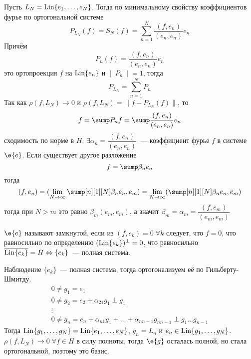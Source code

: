 \documentclass[14pt]{extarticle}
\newcommand{\Line}[2]{\Lin\{#1_1,\dots, #1_#2\}}
\begin{document}
\begin{Proof}
    Пусть $L_N = \Line{e}{N}$.
    Тогда по минимальному свойству коэффициентов фурье по ортогональной системе
    $$
    P_{L_N}(f) = S_N(f) = \sum\limits_{n = 1}^N\dfrac{(f, e_n)}{(e_n, e_n)}e_n
    $$
    Причём
    $$
    P_n(f) = \dfrac{(f, e_n)}{(e_n, e_n)}e_n
    $$
    это ортопроекция $f$  на $\operatorname{Lin}\{e_n\}$ и $\|P_n\| = 1$, тогда
    $$
    P_{L_N} = \sum\limits_{n = 1}^N P_n
    $$
    Так как $\rho(f, L_N) \to 0$ и $\rho(f, L_N) = \|f - P_{L_N}(f)\|$, то
    $$
    f = \sump P_nf = \sump \dfrac{(f, e_n)}{(e_n, e_n)}e_n
    $$
    сходимость по норме в $H$.
    $\exists \alpha_n = \dfrac{(f, e_n)}{(e_n, e_n)}$~--- коэффициент фурье $f$ в системе
    $\e{e}$.
    Если существует другое разложение
    $$
    f = \sump \beta_n e_n
    $$
    тогда
    $$
    (f, e_n) = (\lim_{N \to \infty} \sump[n][1][N] \beta_n e_n, e_m) = \lim_{N \to \infty}
    ( \sump[n][1][N] \beta_n e_n, e_m)
    $$
    тогда при $N > m$ это равно $\beta_m (e_m, e_m)$, а значит $\beta_m = \alpha_m =
    \dfrac{(f, e_m)}{(e_m, e_m)}$
\end{Proof}
\begin{Opr}
    $\e{e}$ называют замкнутой, если из $(f, e_k) = 0\; \forall k$ следует, что $f = 0$, что
    равносильно по определению $(\operatorname{Lin}\{e_k\})^\perp = 0$, что равносильно 
    $\overline{\operatorname{Lin}\{e_k\}} = H \Leftrightarrow \{e_k\}$~--- полная система.
\end{Opr}
\begin{MathCl}{Наблюдение}
    $\{e_k\}$~--- полная система, тогда ортогонализуем её по Гильберту-Шмитду.
    \begin{gather*}
        0 \ne g_1 = e_1\\
        0 \ne g_2 = e_2 + \alpha_{21}g_1 \perp g_1\\
        \vdots\\
        0 \ne g_n = e_n + \alpha_{n1}g_1 + \dots + \alpha_{n n-1}g_{nn - 1} \perp g_1 \dots g_
        {n - 1}
    \end{gather*}
    Тогда $\Line{g}{N} = \Line{e}{N}$, $g_n = L_n$ и $e_n \in \Line{g}{N}$.
    $\rho(f, L_N) \to 0\;\forall f \in H$ в силу полноты, тогда $\e{g}$ осталась полной, но 
    стала ортогональной, поэтому это базис.
\end{MathCl}
\end{document}
